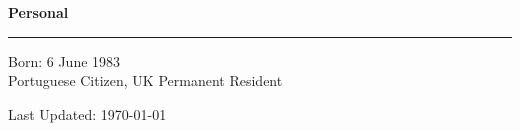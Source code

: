 \documentclass[11pt,a4paper]{article}
\newenvironment{rSection}[1]{%
  \vspace{0.5em}%
  \noindent\textbf{\large #1}%
  \vspace{0.3em}\par
  \hrule
  \vspace{0.5em}
}{%
  \vspace{0.8em}
}
\begin{document}
\begin{rSection}{Personal}
Born: 6 June 1983 \\
Portuguese Citizen, UK Permanent Resident
\end{rSection}

\vspace{1em}
\begin{center}
\scriptsize{Last Updated: \today}
\end{center}
\end{document}
